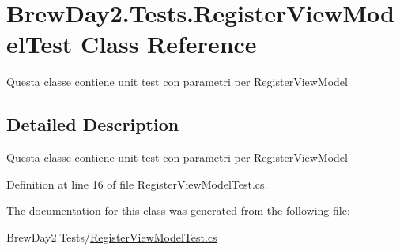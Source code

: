 \hypertarget{class_brew_day2_1_1_tests_1_1_register_view_model_test}{}\section{Brew\+Day2.\+Tests.\+Register\+View\+Model\+Test Class Reference}
\label{class_brew_day2_1_1_tests_1_1_register_view_model_test}


Questa classe contiene unit test con parametri per Register\+View\+Model 




\subsection{Detailed Description}
Questa classe contiene unit test con parametri per Register\+View\+Model



Definition at line 16 of file Register\+View\+Model\+Test.\+cs.



The documentation for this class was generated from the following file\+:\begin{DoxyCompactItemize}
\item 
Brew\+Day2.\+Tests/\mbox{\hyperlink{_register_view_model_test_8cs}{Register\+View\+Model\+Test.\+cs}}\end{DoxyCompactItemize}
